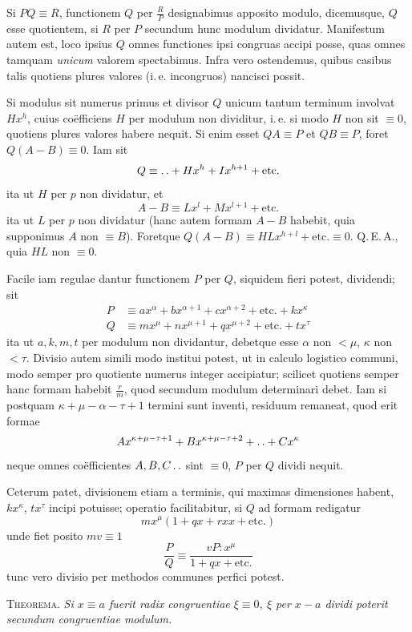 Si $PQ\equiv R$, functionem $Q$ per $\frac RP$ designabimus apposito modulo, dicemusque, $Q$ esse quotientem, si $R$ per $P$ secundum hunc modulum dividatur. Manifestum autem est, loco ipsius $Q$ omnes functiones ipsi congruas accipi posse, quas omnes tamquam \emph{unicum} valorem spectabimus. Infra vero ostendemus, quibus casibus talis quotiens plures valores (i.\,e. incongruos) nancisci possit.

Si modulus sit numerus primus et divisor $Q$ unicum tantum terminum involvat $Hx^h$, cuius coëfficiens $H$ per modulum non dividitur, i.\,e. si modo $H$ non sit $\equiv0$, quotiens plures valores habere nequit. Si enim esset $QA\equiv P$ et $QB\equiv P$, foret $Q(A-B)\equiv0$. Iam sit
\[
Q\equiv\mathinner{.\,.}+Hx^h+Ix^{h+1}+\text{etc.}
\]
ita ut $H$ per $p$ non dividatur, et
\[
A-B\equiv Lx^l+Mx^{l+1}+\text{etc.}
\]
ita ut $L$ per $p$ non dividatur (hanc autem formam $A-B$ habebit, quia supponimus $A$ non $\equiv B$). Foretque $Q(A-B)\equiv HLx^{h+l}+\text{etc.}\equiv0$. Q.\,E.\,A., quia $HL$ non $\equiv0$.

Facile iam regulae dantur functionem $P$ per $Q$, siquidem fieri potest, dividendi; sit
\[
\begin{aligned}
P&\equiv ax^\alpha+bx^{\alpha+1}+cx^{\alpha+2}+\text{etc.}+kx^\kappa\\
Q&\equiv mx^\mu+nx^{\mu+1}+qx^{\mu+2}+\text{etc.}+tx^\tau
\end{aligned}
\]
ita ut $a,k,m,t$ per modulum non dividantur, debetque esse $\alpha$ non $<\mu$, $\kappa$ non $<\tau$. Divisio autem simili modo institui potest, ut in calculo logistico communi, modo semper pro quotiente numerus integer accipiatur; scilicet quotiens semper
%
hanc formam habebit $\frac rm$, quod secundum modulum determinari debet. Iam si postquam $\kappa+\mu-\alpha-\tau+1$ termini sunt inventi, residuum remaneat, quod erit formae
\[
Ax^{\kappa+\mu-\tau+1}+Bx^{\kappa+\mu-\tau+2}+\mathinner{.\,.}+Cx^\kappa
\]
neque omnes coëfficientes $A,B,C\mathinner{.\,.}$ sint $\equiv0$, $P$ per $Q$ dividi nequit.

Ceterum patet, divisionem etiam a terminis, qui maximas dimensiones habent, $kx^\kappa$, $tx^\tau$ incipi potuisse; operatio facilitabitur, si $Q$ ad formam redigatur
\[
mx^\mu(1+qx+rxx+\text{etc.})
\]
unde fiet posito $mv\equiv1$
\[
\frac PQ\equiv\frac{vP:x^\mu}{1+qx+\text{etc.}}
\]
tunc vero divisio per methodos communes perfici potest.

\textsc{Theorema.} \emph{Si $x\equiv a$ fuerit radix congruentiae $\xi\equiv0$, $\xi$ per $x-a$ dividi poterit secundum congruentiae modulum.}


